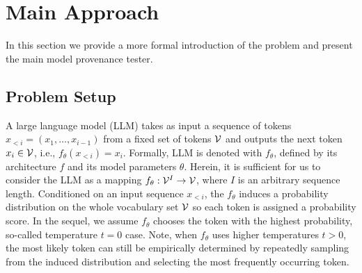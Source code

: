 \section{Main Approach}
\label{sec:approach}

In this section we provide a more formal introduction of the problem and present the main model provenance tester.

\subsection{Problem Setup}
A large language model (LLM) takes as input a sequence of tokens $x_{<i}=(x_1,\ldots,x_{i-1})$ from a fixed set of tokens $\mathcal{V}$ and outputs the next token $x_i \in \mathcal{V}$, i.e., $f_\theta(x_{<i}) = x_i$. Formally, LLM is denoted with $f_\theta$, defined by its architecture $f$ and its model parameters $\theta$.  Herein, it is sufficient for us to consider the LLM as a mapping $f_\theta:\mathcal{V}^I\rightarrow \mathcal{V}$, where $I$ is an arbitrary sequence length. 
Conditioned on an input sequence $x_{<i}$, the $f_\theta$ induces a probability distribution on the whole vocabulary set $\mathcal{V}$ so each token is assigned a probability score. 
In the sequel, we assume $f_\theta$ chooses the token with the highest probability, so-called temperature $t=0$ case. 
Note, when $f_\theta$ uses higher temperatures $t>0$, the most likely token can still be empirically determined by repeatedly sampling from the induced distribution and selecting the most frequently occurring token.

%
%

%

%
%
%

